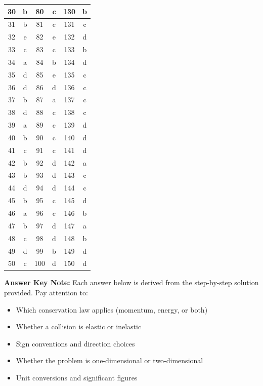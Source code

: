 \documentclass[12pt,letterpaper]{article}
\begin{document}
\begin{center}
\begin{longtable}{|c|c||c|c||c|c|}
\hline
30 & b & 80 & c & 130 & b \\
\hline
31 & b & 81 & c & 131 & c \\
\hline
32 & e & 82 & e & 132 & d \\
\hline
33 & c & 83 & c & 133 & b \\
\hline
34 & a & 84 & b & 134 & d \\
\hline
35 & d & 85 & e & 135 & c \\
\hline
36 & d & 86 & d & 136 & c \\
\hline
37 & b & 87 & a & 137 & c \\
\hline
38 & d & 88 & c & 138 & c \\
\hline
39 & a & 89 & c & 139 & d \\
\hline
40 & b & 90 & c & 140 & d \\
\hline
41 & c & 91 & c & 141 & d \\
\hline
42 & b & 92 & d & 142 & a \\
\hline
43 & b & 93 & d & 143 & c \\
\hline
44 & d & 94 & d & 144 & c \\
\hline
45 & b & 95 & c & 145 & d \\
\hline
46 & a & 96 & c & 146 & b \\
\hline
47 & b & 97 & d & 147 & a \\
\hline
48 & c & 98 & d & 148 & b \\
\hline
49 & d & 99 & b & 149 & d \\
\hline
50 & c & 100 & d & 150 & d \\
\hline
\end{longtable}
\end{center}

\begin{importantbox}
\textbf{Answer Key Note:} Each answer below is derived from the step-by-step solution provided. Pay attention to:
\begin{itemize}
    \item Which conservation law applies (momentum, energy, or both)
    \item Whether a collision is elastic or inelastic
    \item Sign conventions and direction choices
    \item Whether the problem is one-dimensional or two-dimensional
    \item Unit conversions and significant figures
\end{itemize}
\end{importantbox}
\end{document}
